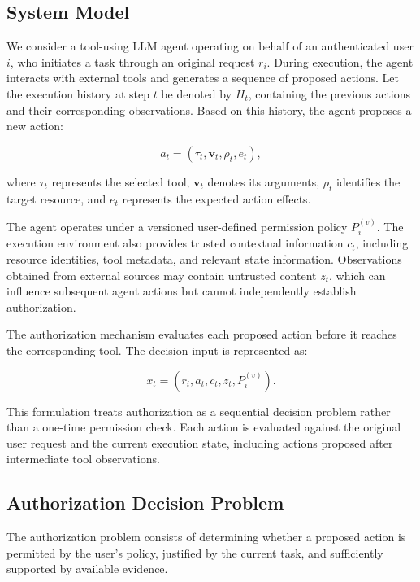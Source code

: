 \documentclass[10pt,conference]{IEEEtran}
\begin{document}
\subsection{System Model}

We consider a tool-using LLM agent operating on behalf of an authenticated user $i$, who initiates a task through an original request $r_i$. During execution, the agent interacts with external tools and generates a sequence of proposed actions. Let the execution history at step $t$ be denoted by $H_t$, containing the previous actions and their corresponding observations. Based on this history, the agent proposes a new action:

\begin{equation}
a_t = (\tau_t, \mathbf{v}_t, \rho_t, e_t),
\end{equation}

where $\tau_t$ represents the selected tool, $\mathbf{v}_t$ denotes its arguments, $\rho_t$ identifies the target resource, and $e_t$ represents the expected action effects.

The agent operates under a versioned user-defined permission policy $P_i^{(v)}$. The execution environment also provides trusted contextual information $c_t$, including resource identities, tool metadata, and relevant state information. Observations obtained from external sources may contain untrusted content $z_t$, which can influence subsequent agent actions but cannot independently establish authorization.

The authorization mechanism evaluates each proposed action before it reaches the corresponding tool. The decision input is represented as:

\begin{equation}
x_t = (r_i, a_t, c_t, z_t, P_i^{(v)}).
\end{equation}

This formulation treats authorization as a sequential decision problem rather than a one-time permission check. Each action is evaluated against the original user request and the current execution state, including actions proposed after intermediate tool observations.

\subsection{Authorization Decision Problem}

The authorization problem consists of determining whether a proposed action is permitted by the user's policy, justified by the current task, and sufficiently supported by available evidence.
\end{document}
